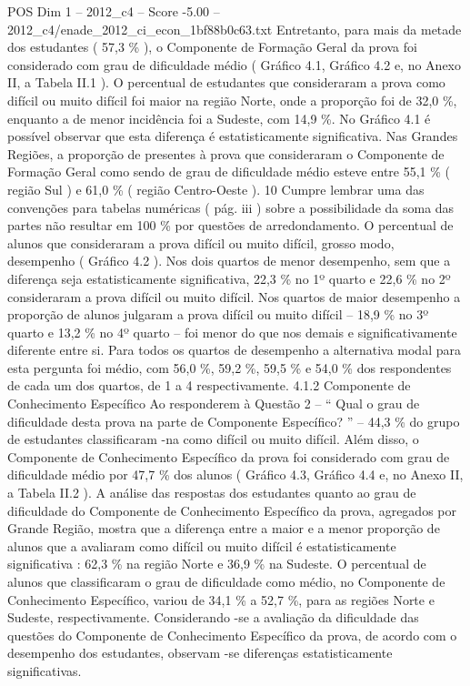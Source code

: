 \begin{textsample}{POS Dim 1 – 2012\_c4 – Score -5.00 – 2012\_c4/enade\_2012\_ci\_econ\_1bf88b0c63.txt}
Entretanto, para mais da metade dos estudantes ( 57,3 \% ), o Componente de Formação Geral da prova foi considerado com grau de dificuldade médio ( Gráfico 4.1, Gráfico 4.2 e, no Anexo II, a Tabela II.1 ).
O percentual de estudantes que consideraram a prova como difícil ou muito difícil foi maior na região Norte, onde a proporção foi de 32,0 \%, enquanto a de menor incidência foi a Sudeste, com 14,9 \%.
No Gráfico 4.1 é possível observar que esta diferença é estatisticamente significativa.
Nas Grandes Regiões, a proporção de presentes à prova que consideraram o Componente de Formação Geral como sendo de grau de dificuldade médio esteve entre 55,1 \% ( região Sul ) e 61,0 \% ( região Centro-Oeste ). 10 Cumpre lembrar uma das convenções para tabelas numéricas ( pág. iii ) sobre a possibilidade da soma das partes não resultar em 100 \% por questões de arredondamento.
O percentual de alunos que consideraram a prova difícil ou muito difícil, grosso modo, desempenho ( Gráfico 4.2 ).
Nos dois quartos de menor desempenho, sem que a diferença seja estatisticamente significativa, 22,3 \% no 1º quarto e 22,6 \% no 2º consideraram a prova difícil ou muito difícil.
Nos quartos de maior desempenho a proporção de alunos julgaram a prova difícil ou muito difícil – 18,9 \% no 3º quarto e 13,2 \% no 4º quarto – foi menor do que nos demais e significativamente diferente entre si.
Para todos os quartos de desempenho a alternativa modal para esta pergunta foi médio, com 56,0 \%, 59,2 \%, 59,5 \% e 54,0 \% dos respondentes de cada um dos quartos, de 1 a 4 respectivamente. 4.1.2 Componente de Conhecimento Específico Ao responderem à Questão 2 – “ Qual o grau de dificuldade desta prova na parte de Componente Específico? ” – 44,3 \% do grupo de estudantes classificaram -na como difícil ou muito difícil.
Além disso, o Componente de Conhecimento Específico da prova foi considerado com grau de dificuldade médio por 47,7 \% dos alunos ( Gráfico 4.3, Gráfico 4.4 e, no Anexo II, a Tabela II.2 ).
A análise das respostas dos estudantes quanto ao grau de dificuldade do Componente de Conhecimento Específico da prova, agregados por Grande Região, mostra que a diferença entre a maior e a menor proporção de alunos que a avaliaram como difícil ou muito difícil é estatisticamente significativa : 62,3 \% na região Norte e 36,9 \% na Sudeste.
O percentual de alunos que classificaram o grau de dificuldade como médio, no Componente de Conhecimento Específico, variou de 34,1 \% a 52,7 \%, para as regiões Norte e Sudeste, respectivamente.
Considerando -se a avaliação da dificuldade das questões do Componente de Conhecimento Específico da prova, de acordo com o desempenho dos estudantes, observam -se diferenças estatisticamente significativas.

\end{textsample}
